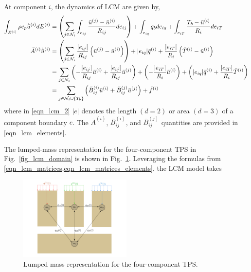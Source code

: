 At component $i$, the dynamics of LCM are given by,
\begin{subequations}
    \begin{align}
        \int_{E^{(i)}}\rho c_p \dot{\bar{u}}^{(i)} dE^{(i)} &= \left(\sum_{j\in\mathcal{N}_i}\int_{e_{ij}}\frac{\bar{u}^{(j)} - \bar{u}^{(i)}}{R_{ij}}de_{ij}\right) + \int_{e_{iq}} q_b de_{iq} + \int_{e_{iT}}\frac{T_b - \bar{u}^{(i)}}{R_i}de_{iT}\label{eqn_lcm_1}\\
        \bar{A}^{(i)}\dot{\bar{u}}^{(i)} &= \left(\sum_{j\in\mathcal{N}_i}\frac{|e_{ij}|}{R_{ij}}\left(\bar{u}^{(j)} - \bar{u}^{(i)}\right)\right) + |e_{iq}|\bar{q}^{(i)} + \frac{|e_{iT}|}{R_i}\left(\bar{T}^{(i)} - \bar{u}^{(i)}\right) \label{eqn_lcm_2}\\ 
        &= \sum_{j\in\mathcal{N}_i}\left(-\frac{|e_{ij}|}{R_{ij}}\bar{u}^{(i)} + \frac{|e_{ij}|}{R_{ij}}\bar{u}^{(j)}\right) + \left(-\frac{|e_{iT}|}{R_{i}}\bar{u}^{(i)}\right) + \left(|e_{iq}|\bar{q}^{(i)} + \frac{|e_{iT}|}{R_i}\bar{T}^{(i)}\right)\label{eqn_lcm_3}\\
        &= \sum_{j\in\mathcal{N}_i\cup\left\{T_b\right\}}\left(\bar{B}^{(i)}_{ij}\bar{u}^{(i)} + \bar{B}^{(j)}_{ij}\bar{u}^{(j)}\right) + \bar{f}^{(i)}\label{eqn_lcm_4}
    \end{align}
\end{subequations}
where in \cref{eqn_lcm_2} $|e|$ denotes the length $(d=2)$ or area $(d=3)$ of a component boundary $e$. The $\bar{A}^{(i)}$, $\bar{B}_{ij}^{(i)}$, and $\bar{B}_{ij}^{(j)}$ quantities are provided in \cref{eqn_lcm_elements}.

The lumped-mass representation for the four-component TPS in Fig.~\ref{fig_lcm_domain} is shown in Fig.~\ref{fig_lumped_mass_representation}. Leveraging the formulas from \cref{eqn_lcm_matrices,eqn_lcm_matrices_elements}, the LCM model takes

\begin{figure}
    \centering
    \includegraphics[width=0.5\textwidth]{./figs/lumped_mass_representation.png}
    \caption{Lumped mass representation for the four-component TPS.}
    \label{fig_lumped_mass_representation}
\end{figure}


